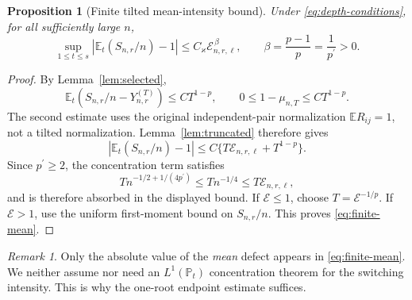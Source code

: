 \documentclass[11pt]{article}
\numberwithin{equation}{section}
\newtheorem{proposition}[theorem]{Proposition}
\theoremstyle{definition}
\theoremstyle{remark}
\newtheorem{remark}[theorem]{Remark}
\newcommand{\E}{\mathbb E}
\newcommand{\Pp}{\mathbb P}
\newcommand{\pdual}{{p^{\prime}}}
\newcommand{\abs}[1]{\left|#1\right|}
\begin{document}
\begin{proposition}[Finite tilted mean-intensity bound]\label{prop:finite-mean}
Under \eqref{eq:depth-conditions}, for all sufficiently large $n$,
\begin{equation}\label{eq:finite-mean}
 \sup_{1\le t\le s}\abs{\E_t(S_{n,r}/n)-1}
 \le C_\varkappa\mathcal E_{n,r,\ell}^{\,\beta},
 \qquad \beta=\frac{p-1}{p}=\frac1\pdual>0.
\end{equation}
\end{proposition}
\begin{proof}
By Lemma~\ref{lem:selected},
\[
 \E_t(S_{n,r}/n-Y_{n,r}^{(T)})\le CT^{1-p},
 \qquad 0\le1-\mu_{n,T}\le CT^{1-p}.
\]
The second estimate uses the original independent-pair normalization $\E R_{ij}=1$, not a tilted normalization. Lemma~\ref{lem:truncated} therefore gives
\[
 \abs{\E_t(S_{n,r}/n)-1}
 \le C\{T\mathcal E_{n,r,\ell}+T^{1-p}\}.
\]
Since $\pdual\ge2$, the concentration term satisfies
\[
 Tn^{-1/2+1/(4\pdual)}\le Tn^{-1/4}\le T\mathcal E_{n,r,\ell},
\]
and is therefore absorbed in the displayed bound. If $\mathcal E\le1$, choose $T=\mathcal E^{-1/p}$. If $\mathcal E>1$, use the uniform first-moment bound on $S_{n,r}/n$. This proves \eqref{eq:finite-mean}.
\end{proof}

\begin{remark}
Only the absolute value of the \emph{mean} defect appears in \eqref{eq:finite-mean}. We neither assume nor need an $L^1(\Pp_t)$ concentration theorem for the switching intensity. This is why the one-root endpoint estimate suffices.
\end{remark}
\end{document}
